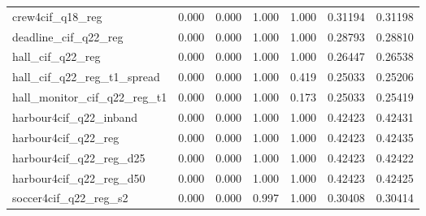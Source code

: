 \begin{table}[t]
{\begin{tabular}{lllllll}
crew4cif\_q18\_reg & 0.000 & 0.000 & 1.000 & 1.000 & 0.31194 & 0.31198 \\
deadline\_cif\_q22\_reg & 0.000 & 0.000 & 1.000 & 1.000 & 0.28793 & 0.28810 \\
hall\_cif\_q22\_reg & 0.000 & 0.000 & 1.000 & 1.000 & 0.26447 & 0.26538 \\
hall\_cif\_q22\_reg\_t1\_spread & 0.000 & 0.000 & 1.000 & 0.419 & 0.25033 & 0.25206 \\
hall\_monitor\_cif\_q22\_reg\_t1 & 0.000 & 0.000 & 1.000 & 0.173 & 0.25033 & 0.25419 \\
harbour4cif\_q22\_inband & 0.000 & 0.000 & 1.000 & 1.000 & 0.42423 & 0.42431 \\
harbour4cif\_q22\_reg & 0.000 & 0.000 & 1.000 & 1.000 & 0.42423 & 0.42435 \\
harbour4cif\_q22\_reg\_d25 & 0.000 & 0.000 & 1.000 & 1.000 & 0.42423 & 0.42422 \\
harbour4cif\_q22\_reg\_d50 & 0.000 & 0.000 & 1.000 & 1.000 & 0.42423 & 0.42425 \\
soccer4cif\_q22\_reg\_s2 & 0.000 & 0.000 & 0.997 & 1.000 & 0.30408 & 0.30414 \\
\bottomrule
\end{tabular}}
\end{table}
